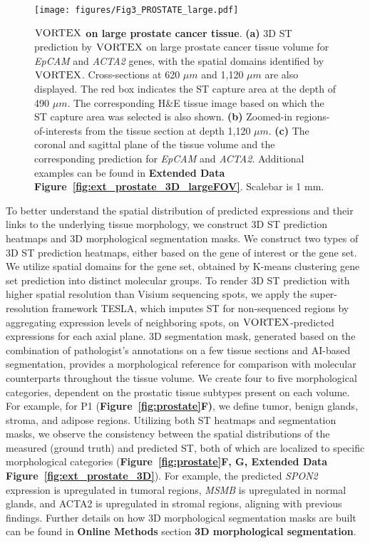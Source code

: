 
\begin{figure*}[]
\centering  
\texttt{[image: figures/Fig3\_PROSTATE\_large.pdf]}
\caption{\textbf{$\textsc{VORTEX}$ on large prostate cancer tissue}. \textbf{(a)} 3D ST prediction by $\textsc{VORTEX}$ on large prostate cancer tissue volume for \textit{EpCAM} and \textit{ACTA2} genes, with the spatial domains identified by $\textsc{VORTEX}$. Cross-sections at 620 $\mu m$ and 1,120 $\mu m$ are also displayed. The red box indicates the ST capture area at the depth of 490 $\mu m$. The corresponding H\&E tissue image based on which the ST capture area was selected is also shown.
\textbf{(b)} Zoomed-in regions-of-interests from the tissue section at depth 1,120 $\mu m$.
\textbf{(c)} The coronal and sagittal plane of the tissue volume and the corresponding prediction for \textit{EpCAM} and \textit{ACTA2}.
Additional examples can be found in \textbf{Extended Data Figure~\ref{fig:ext_prostate_3D_largeFOV}}. Scalebar is 1 mm.
}
\label{fig:ext_prostate_large}
\end{figure*}

To better understand the spatial distribution of predicted expressions and their links to the underlying tissue morphology, we construct 3D ST prediction heatmaps and 3D morphological segmentation masks. We construct two types of 3D ST prediction heatmaps, either based on the gene of interest or the gene set. We utilize spatial domains for the gene set, obtained by K-means clustering gene set prediction into distinct molecular groups. To render 3D ST prediction with higher spatial resolution than Visium sequencing spots, we apply the super-resolution framework TESLA\cite{hu2023deciphering}, which imputes ST for non-sequenced regions by aggregating expression levels of neighboring spots, on $\textsc{VORTEX}$-predicted expressions for each axial plane. 3D segmentation mask, generated based on the combination of pathologist's annotations on a few tissue sections and AI-based segmentation\cite{kirillov2023segment, ravi2024sam2segmentimages}, provides a morphological reference for comparison with molecular counterparts throughout the tissue volume. We create four to five morphological categories, dependent on the prostatic tissue subtypes present on each volume. For example, for P1 (\textbf{Figure~\ref{fig:prostate}F)}, we define tumor, benign glands, stroma, and adipose regions.
Utilizing both ST heatmaps and segmentation masks, we observe the consistency between the spatial distributions of the measured (ground truth) and predicted ST, both of which are localized to specific morphological categories (\textbf{Figure~\ref{fig:prostate}F, G, Extended Data Figure~\ref{fig:ext_prostate_3D}}). For example, the predicted \textit{SPON2} expression is upregulated in tumoral regions, \textit{MSMB} is upregulated in normal glands, and ACTA2 is upregulated in stromal regions, aligning with previous findings\cite{whitaker2010rs10993994, qian2012spondin, berglund2018spatial}. Further details on how 3D morphological segmentation masks are built can be found in \textbf{Online Methods} section \textbf{3D morphological segmentation}.

